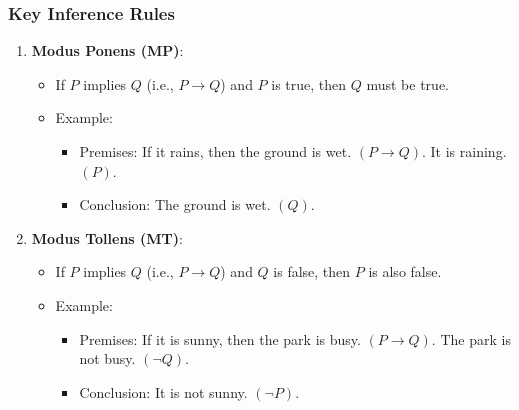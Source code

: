 \documentclass[aspectratio=169]{beamer}
\begin{document}
\begin{frame}[fragile]
    \frametitle{Key Inference Rules}
    \begin{enumerate}
        \item \textbf{Modus Ponens (MP)}:
              \begin{itemize}
                  \item If \( P \) implies \( Q \) (i.e., \( P \rightarrow Q \)) and \( P \) is true, then \( Q \) must be true.
                  \item Example:
                  \begin{itemize}
                      \item Premises: If it rains, then the ground is wet. \( (P \rightarrow Q) \). It is raining. \( (P) \).
                      \item Conclusion: The ground is wet. \( (Q) \).
                  \end{itemize}
              \end{itemize}

        \item \textbf{Modus Tollens (MT)}:
              \begin{itemize}
                  \item If \( P \) implies \( Q \) (i.e., \( P \rightarrow Q \)) and \( Q \) is false, then \( P \) is also false.
                  \item Example:
                  \begin{itemize}
                      \item Premises: If it is sunny, then the park is busy. \( (P \rightarrow Q) \). The park is not busy. \( (\neg Q) \).
                      \item Conclusion: It is not sunny. \( (\neg P) \).
                  \end{itemize}
              \end{itemize}
    \end{enumerate}
\end{frame}
\end{document}

